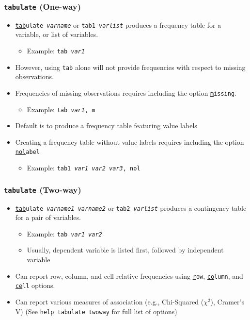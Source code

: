 \documentclass{beamer}
\begin{document}
\begin{frame}
	\frametitle{\texttt{tabulate} (One-way)}
		\begin{itemize}
			\item \texttt{\underline{tab}ulate \textit{varname}} or \texttt{tab1 \textit{varlist}} produces a frequency table for a variable, or list of variables.
				\begin{itemize}
					\item Example: \texttt{tab \textit{var1}}
				\end{itemize}
			\item However, using \texttt{tab} alone will not provide frequencies with respect to missing observations.
			\item Frequencies of missing observations requires including the option \texttt{\underline{m}issing}.
				\begin{itemize}
					\item Example: \texttt{tab \textit{var1}, m}
				\end{itemize}
			\item Default is to produce a frequency table featuring value labels
			\item Creating a frequency table without value labels requires including the option \texttt{\underline{nol}abel}
				\begin{itemize}
					\item Example: \texttt{tab1 \textit{var1 var2 var3}, nol}
				\end{itemize}
		\end{itemize}
\end{frame}

\begin{frame}
	\frametitle{\texttt{tabulate} (Two-way)}
		\begin{itemize}
			\item \texttt{\underline{tab}ulate \textit{varname1} \textit{varname2}} or \texttt{tab2 \textit{varlist}} produces a contingency table for a pair of variables.
				\begin{itemize}
					\item Example: \texttt{tab \textit{var1} \textit{var2}}
					\item Usually, dependent variable is listed first, followed by independent variable
				\end{itemize}
			\item Can report row, column, and cell relative frequencies using \texttt{\underline{r}ow}, \texttt{\underline{co}lumn}, and \texttt{\underline{ce}ll} options.
			\item Can report various measures of association (e.g., Chi-Squared ($\chi^2$), Cramer's V) (See \texttt{help tabulate twoway} for full list of options)
		\end{itemize}
\end{frame}
\end{document}
